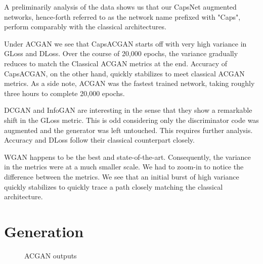 A preliminarily analysis of the data shows us that our CapsNet augmented networks, hence-forth referred to as the network name prefixed with "Caps", perform comparably with the classical architectures. 
\par\bigskip

Under ACGAN we see that CapsACGAN starts off with very high variance in GLoss and DLoss. Over the course of 20,000 epochs, the variance gradually reduces to match the Classical ACGAN metrics at the end. Accuracy of CapsACGAN, on the other hand, quickly stabilizes to meet classical ACGAN metrics. As a side note, ACGAN was the fastest trained network, taking roughly three hours to complete 20,000 epochs.
\par\bigskip

DCGAN and InfoGAN are interesting in the sense that they show a remarkable shift in the GLoss metric. This is odd considering only the discriminator code was augmented and the generator was left untouched. This requires further analysis. Accuracy and DLoss follow their classical counterpart closely.
\par\bigskip

WGAN happens to be the best and state-of-the-art. Consequently, the variance in the metrics were at a much smaller scale. We had to zoom-in to notice the difference between the metrics. We see that an initial burst of high variance quickly stabilizes to quickly trace a path closely matching the classical architecture.
\par\bigskip

\section{Generation} %
\label{sec:generation}

\begin{figure}[H]
    \centering
    \caption{ACGAN outputs}%
    \label{fig:acgan_gen}%
\end{figure}

